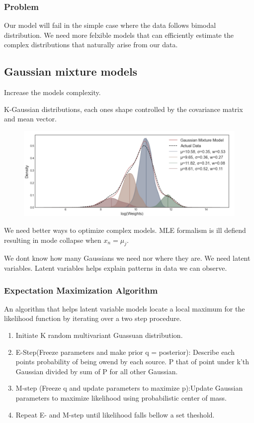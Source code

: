 \subsubsection{Problem}
Our model will fail in the simple case where the data follows bimodal distribution.
We need more felxible models that can efficiently estimate the complex distributions that naturally arise from our data.

\subsection{Gaussian mixture models}
Increase the models complexity.

K-Gaussian distributions, each ones shape controlled by the covariance matrix and mean vector.
\begin{figure}[!h]
    \includegraphics[width = \columnwidth]{figures/GenAI1/GMM.png}
\end{figure}
We need better ways to optimize complex models.
MLE formalism is ill defiend resulting in mode collapse when \(x_n = \mu_j\).

We dont know how many Gaussians we need nor where they are.
We need latent variables.
Latent variables helps explain patterns in data we can observe.
\subsubsection{Expectation Maximization Algorithm}
An algorithm that helps latent variable models locate a local maximum for the likelihood function by iterating over a two step procedure.

\begin{enumerate}
    \item Initiate K random multivariant Guassuan distribution.
    \item E-Step(Freeze parameters and make prior q = posterior): Describe each points probability of being owend by each source. P that of point under k'th Gaussian divided by sum of P for all other Gaussian.
    \item M-step (Freeze q and update parameters to maximize p):Update Gaussian parameters to maximize likelihood using probabilistic center of mass.
    \item Repeat E- and M-step until likelihood falls bellow a set theshold.
\end{enumerate}

